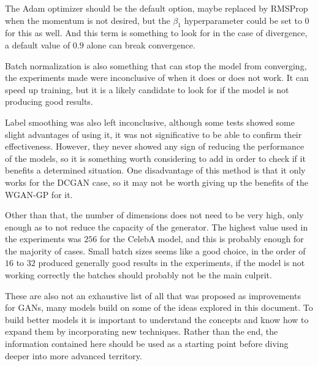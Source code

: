 The Adam optimizer should be the default option, maybe replaced by RMSProp when the momentum is not desired, but the $\beta_1$ hyperparameter could be set to 0 for this as well. And this term is something to look for in the case of divergence, a default value of $0.9$ alone can break convergence.

Batch normalization is also something that can stop the model from converging, the experiments made were inconclusive of when it does or does not work. It can speed up training, but it is a likely candidate to look for if the model is not producing good results.

Label smoothing was also left inconclusive, although some tests showed some slight advantages of using it, it was not significative to be able to confirm their effectiveness. However, they never showed any sign of reducing the performance of the models, so it is something worth considering to add in order to check if it benefits a determined situation. One disadvantage of this method is that it only works for the \gls{DCGAN} case, so it may not be worth giving up the benefits of the \gls{WGAN-GP} for it.

Other than that, the number of dimensions does not need to be very high, only enough as to not reduce the capacity of the generator. The highest value used in the experiments was $256$ for the CelebA model, and this is probably enough for the majority of cases. Small batch sizes seems like a good choice, in the order of $16$ to $32$ produced generally good results in the experiments, if the model is not working correctly the batches should probably not be the main culprit.

These are also not an exhaustive list of all that was proposed as improvements for \acp{GAN}, many models build on some of the ideas explored in this document. To build better models it is important to understand the concepts and know how to expand them by incorporating new techniques. Rather than the end, the information contained here should be used as a starting point before diving deeper into more advanced territory.
